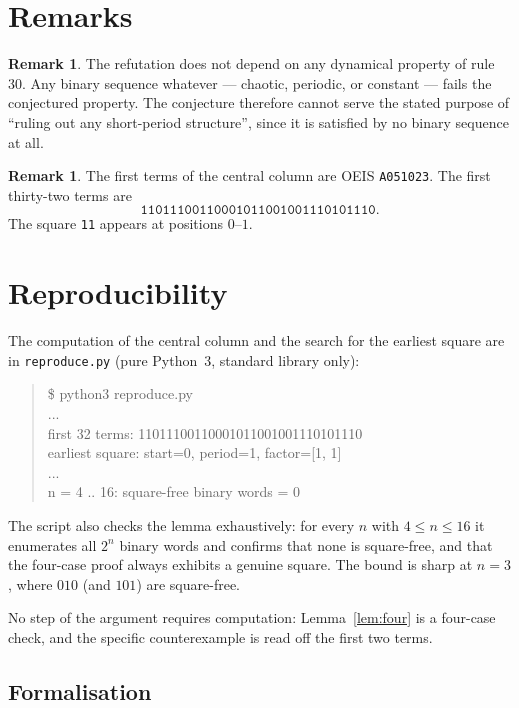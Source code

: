 \documentclass[11pt]{article}
\theoremstyle{definition}
\newtheorem{remark}[theorem]{Remark}
\begin{document}
\section{Remarks}

\begin{remark}\label{rem:scope}
The refutation does not depend on any dynamical property of rule 30. Any
binary sequence whatever --- chaotic, periodic, or constant --- fails the
conjectured property. The conjecture therefore cannot serve the stated purpose
of ``ruling out any short-period structure'', since it is satisfied by no
binary sequence at all.
\end{remark}

\begin{remark}
The first terms of the central column are OEIS \texttt{A051023}. The first
thirty-two terms are
\[
\texttt{11011100110001011001001110101110}.
\]
The square \texttt{11} appears at positions $0$--$1$.
\end{remark}

\section{Reproducibility}

The computation of the central column and the search for the earliest square
are in \texttt{reproduce.py} (pure Python~3, standard library only):

\begin{quote}\ttfamily
\$ python3 reproduce.py\\
...\\
first 32 terms: 11011100110001011001001110101110\\
earliest square: start=0, period=1, factor=[1, 1]\\
...\\
n = 4 .. 16: square-free binary words = 0\\
\end{quote}

The script also checks the lemma exhaustively: for every $n$ with
$4 \le n \le 16$ it enumerates all $2^n$ binary words and confirms that none
is square-free, and that the four-case proof always exhibits a genuine square.
The bound is sharp at $n = 3$, where $010$ (and $101$) are square-free.

No step of the argument requires computation: Lemma~\ref{lem:four} is a
four-case check, and the specific counterexample is read off the first two
terms.

\subsection*{Formalisation}
\end{document}
